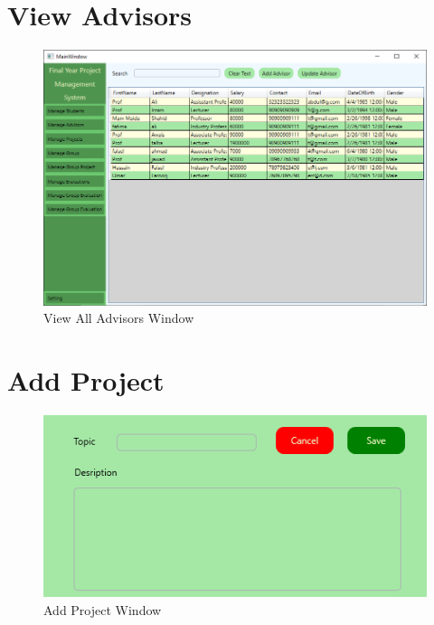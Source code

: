 \documentclass[a4paper, 12pt, oneside]{uet_thesis}
\begin{document}
\section{View Advisors}
\begin{figure}[h]
    \centering
    \includegraphics[width=1\textwidth]{Figures/ViewAdvisors.png}
    \caption{View All Advisors Window}
    \label{fig:my_label}
\end{figure}
\clearpage

\section{Add Project}
\begin{figure}[h]
    \centering
    \includegraphics[width=1\textwidth]{Figures/AddProject.png}
    \caption{Add Project Window}
    \label{fig:my_label}
\end{figure}
\end{document}
